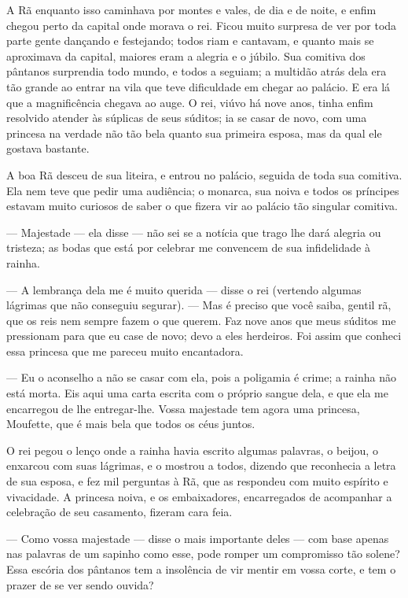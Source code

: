 A Rã enquanto isso caminhava por montes e vales, de dia e de noite, e
enfim chegou perto da capital onde morava o rei. Ficou muito surpresa
de ver por toda parte gente dançando e festejando; todos riam e
cantavam, e quanto mais se aproximava da capital, maiores eram a
alegria e o júbilo. Sua comitiva dos pântanos surprendia todo mundo,
e todos a seguiam; a multidão atrás dela era tão grande ao entrar na
vila que teve dificuldade em chegar ao palácio. E era lá que a
magnificência chegava ao auge. O rei, viúvo há nove anos, tinha enfim
resolvido atender às súplicas de seus súditos; ia se casar de novo,
com uma princesa na verdade não tão bela quanto sua primeira esposa,
mas da qual ele gostava bastante. 

A boa Rã desceu de sua liteira, e entrou no palácio, seguida de toda
sua comitiva. Ela nem teve que pedir uma audiência; o monarca, sua
noiva e todos os príncipes estavam muito curiosos de saber o que
fizera vir ao palácio tão singular comitiva.

— Majestade — ela disse — não sei se a notícia que trago lhe dará
alegria ou tristeza; as bodas que está por celebrar me convencem de
sua infidelidade à rainha.

— A lembrança dela me é muito querida — disse o rei (vertendo algumas
lágrimas que não conseguiu segurar). — Mas é preciso que você saiba,
gentil rã, que os reis nem sempre fazem o que querem. Faz nove anos
que meus súditos me pressionam para que eu case de novo; devo a eles
herdeiros. Foi assim que conheci essa princesa que me pareceu muito
encantadora.

— Eu o aconselho a não se casar com ela, pois a poligamia é crime; a
rainha não está morta. Eis aqui uma carta escrita com o próprio
sangue dela, e que ela me encarregou de lhe entregar-lhe. Vossa
majestade tem agora uma princesa, Moufette, que é mais bela que todos
os céus juntos.

O rei pegou o lenço onde a rainha havia escrito algumas palavras, o
beijou, o enxarcou com suas lágrimas, e o mostrou a todos, dizendo
que reconhecia a letra de sua esposa, e fez mil perguntas à Rã, que
as respondeu com muito espírito e vivacidade. A princesa noiva, e os
embaixadores, encarregados de acompanhar a celebração de seu
casamento, fizeram cara feia.

— Como vossa majestade — disse o mais importante deles — com base
apenas nas palavras de um sapinho como esse, pode romper um
compromisso tão solene? Essa escória dos pântanos tem a insolência de
vir mentir em vossa corte, e tem o prazer de se ver sendo ouvida? 

